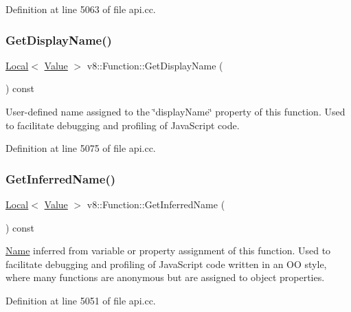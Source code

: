 Definition at line 5063 of file api.\+cc.

\mbox{\label{classv8_1_1Function_a4266e0c48da5fd6ba4fd6b759e5f53f3}} 
\subsubsection{\texorpdfstring{Get\+Display\+Name()}{GetDisplayName()}}
{\footnotesize\ttfamily \mbox{\hyperlink{classv8_1_1Local}{Local}}$<$ \mbox{\hyperlink{classv8_1_1Value}{Value}} $>$ v8\+::\+Function\+::\+Get\+Display\+Name (\begin{DoxyParamCaption}{ }\end{DoxyParamCaption}) const}

User-\/defined name assigned to the \char`\"{}display\+Name\char`\"{} property of this function. Used to facilitate debugging and profiling of Java\+Script code. 

Definition at line 5075 of file api.\+cc.

\mbox{\label{classv8_1_1Function_a3c6402a488df8b43ae5c38587fa6989a}} 
\subsubsection{\texorpdfstring{Get\+Inferred\+Name()}{GetInferredName()}}
{\footnotesize\ttfamily \mbox{\hyperlink{classv8_1_1Local}{Local}}$<$ \mbox{\hyperlink{classv8_1_1Value}{Value}} $>$ v8\+::\+Function\+::\+Get\+Inferred\+Name (\begin{DoxyParamCaption}{ }\end{DoxyParamCaption}) const}

\mbox{\hyperlink{classv8_1_1Name}{Name}} inferred from variable or property assignment of this function. Used to facilitate debugging and profiling of Java\+Script code written in an OO style, where many functions are anonymous but are assigned to object properties. 

Definition at line 5051 of file api.\+cc.

\mbox{\label{classv8_1_1Function_a87bc63f97a9a39f83051570519fc63c2}} 

